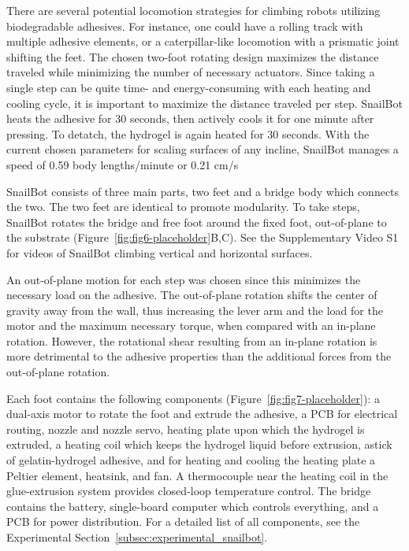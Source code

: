 There are several potential locomotion strategies for climbing robots utilizing biodegradable adhesives. For instance, one could have a rolling track with multiple adhesive elements, or a caterpillar-like locomotion with a prismatic joint shifting the feet. The chosen two-foot rotating design maximizes the distance traveled while minimizing the number of necessary actuators. Since taking a single step can be quite time- and energy-consuming with each heating and cooling cycle, it is important to maximize the distance traveled per step. SnailBot heats the adhesive for 30 seconds, then actively cools it for one minute after pressing. To detatch, the hydrogel is again heated for 30 seconds. With the current chosen parameters for scaling surfaces of any incline, SnailBot manages a speed of 0.59 body lengths/minute or 0.21 cm/s

SnailBot consists of three main parts, two feet and a bridge body which connects the two. The two feet are identical to promote modularity. To take steps, SnailBot rotates the bridge and free foot around the fixed foot, out-of-plane to the substrate (Figure~\ref{fig:fig6-placeholder}B,C). See the Supplementary Video S1 for videos of SnailBot climbing vertical and horizontal surfaces.

An out-of-plane motion for each step was chosen since this minimizes the necessary load on the adhesive. The out-of-plane rotation shifts the center of gravity away from the wall, thus increasing the lever arm and the load for the motor and the maximum necessary torque, when compared with an in-plane rotation. However, the rotational shear resulting from an in-plane rotation is more detrimental to the adhesive properties than the additional forces from the out-of-plane rotation. 

Each foot contains the following components (Figure~\ref{fig:fig7-placeholder}): a dual-axis motor to rotate the foot and extrude the adhesive, a PCB for electrical routing, nozzle and nozzle servo, heating plate upon which the hydrogel is extruded, a heating coil which keeps the hydrogel liquid before extrusion, astick of gelatin-hydrogel adhesive, and for heating and cooling the heating plate a Peltier element, heatsink, and fan. 
A thermocouple near the heating coil in the glue-extrusion system provides closed-loop temperature control. 
The bridge contains the battery, single-board computer which controls everything, and a PCB for power distribution. 
For a detailed list of all components, see the Experimental Section~\ref{subsec:experimental_snailbot}.


